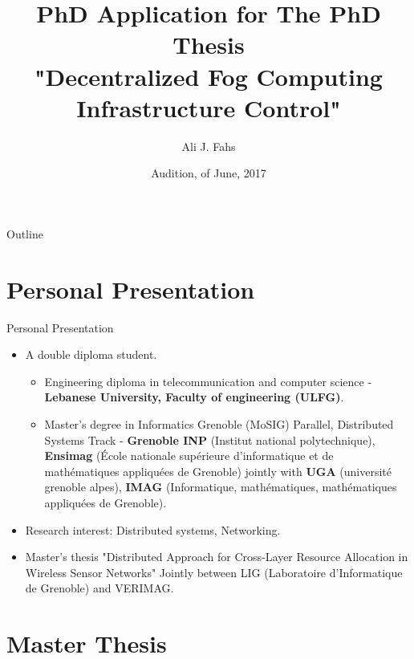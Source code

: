 \documentclass{beamer}
\title{PhD Application for The PhD Thesis\\ "Decentralized Fog Computing Infrastructure Control"}
\subtitle{}
\author{Ali J. Fahs}%
\institute[Institut de Recherche en Informatique et Systèmes Aléatoires (IRISA)] %
{
 Supervised by Professor Guillaume Pierre 
   }
\date{Audition, \nth{8} of June, 2017}
\begin{document}
\begin{frame}
  \titlepage
\end{frame}

\begin{frame}{Outline}
  \tableofcontents
 
\end{frame}

\section{Personal Presentation}
\begin{frame}{Personal Presentation}
\begin{itemize}
\item A double diploma student.
\begin{itemize}
\item Engineering diploma in telecommunication and computer science - \textbf{Lebanese University, Faculty of engineering (ULFG)}.
\item Master's degree in Informatics Grenoble (MoSIG) Parallel, Distributed Systems Track - \textbf{Grenoble INP} (Institut national polytechnique), \textbf{Ensimag} (\'Ecole nationale sup\'erieure d'informatique et de math\'ematiques appliqu\'ees de Grenoble) jointly with \textbf{UGA} (universit\'e grenoble alpes), \textbf{IMAG} (Informatique, math\'ematiques, math\'ematiques appliqu\'ees de Grenoble).
\end{itemize}

\item Research interest: \alert{Distributed systems, Networking.}
\item Master's thesis "Distributed Approach for Cross-Layer Resource Allocation in Wireless Sensor Networks" Jointly between LIG (Laboratoire d'Informatique de Grenoble) and VERIMAG.
\end{itemize}

 
\end{frame}


\section{Master Thesis}
\end{document}
